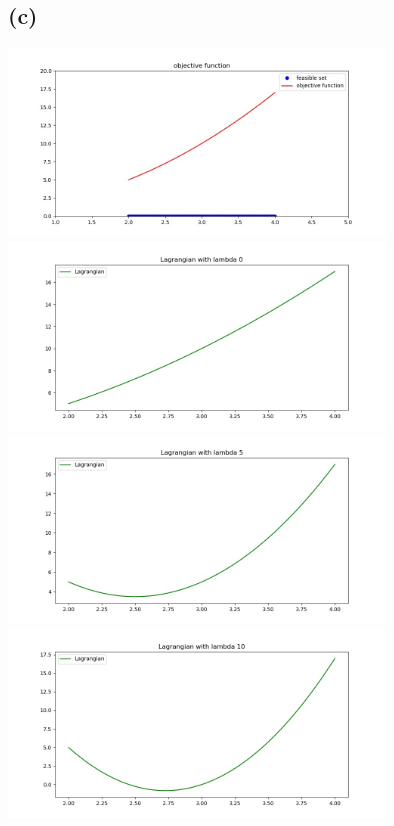 \documentclass[12pt, a4 paper]{article}
\begin{document}
\begin{framed}
        \subsection{(c)}
        {\centering
        \includegraphics[width=10cm, height=5cm]{7c.jpg}
        }
        {\centering
        \includegraphics[width=10cm, height=5cm]{7c-lam0.jpg}
        }
        {\centering
        \includegraphics[width=10cm, height=5cm]{7c-lam5.jpg}
        }
        {\centering
        \includegraphics[width=10cm, height=5cm]{7c-lam10.jpg}
        }


\end{framed}
\end{document}
